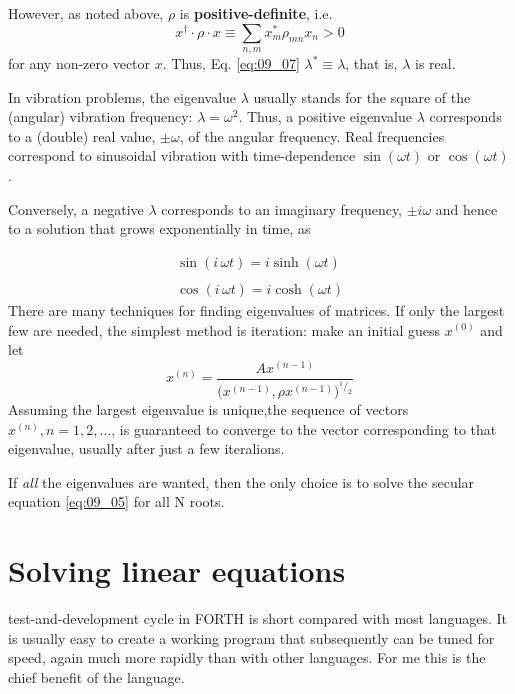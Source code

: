 However, as noted above, $\rho$ is \textbf{positive-definite}, i.e.
\begin{equation}
    \label{eq:09_08}
    x^\dagger \cdot \rho \cdot x \equiv
    \sum_{n,m} x_m^{*} \rho_{mn} x_n > 0
\end{equation}
for any non-zero vector $x$. Thus, Eq. \ref{eq:09_07} $\lambda^*\equiv\lambda$, that is, $\lambda$ is real.

In vibration problems, the eigenvalue $\lambda$ usually stands for the
square of the (angular) vibration frequency: $\lambda=\omega^2$. Thus, a positive eigenvalue $\lambda$ corresponds to a (double) real value, $\pm\omega$, of the
angular frequency. Real frequencies correspond to sinusoidal
vibration with time-dependence $\sin(\omega t)$ or $\cos(\omega t)$.

Conversely, a negative $\lambda$ corresponds to an imaginary frequency,
$\pm i \omega$ and hence to a solution that grows exponentially in time, as

\begin{align}
\sin(i\, \omega t) = i \sinh(\omega t)\nonumber \\
\\
\cos(i\, \omega t) = i \cosh(\omega t)\nonumber
\end{align}
There are many techniques for finding eigenvalues of matrices.
If only the largest few are needed, the simplest method is iteration: make an
initial guess $x^{(0)}$ and let
\begin{equation}
    x^{(n)}=\frac{A x^{(n-1)}}{\Big(x^{(n-1)}, \rho x^{(n-1)}\Big)^{^1/_2}}\nonumber
\end{equation}
Assuming the largest eigenvalue is unique,the sequence of vectors $x^{(n)} , n = 1, 2,\dotsc$, is guaranteed to converge to the vector
corresponding to that eigenvalue, usually after just a few iteralions.

If \textit{all} the eigenvalues are wanted, then the only choice is to solve
the secular equation \ref{eq:09_05} for all N roots.

\section{ Solving linear equations}
 test-and-development cycle in FORTH is short compared
with most languages. It is usually easy to create a working
program that subsequently can be tuned for speed, again much
more rapidly than with other languages. For me this is the chief
benefit of the language.

